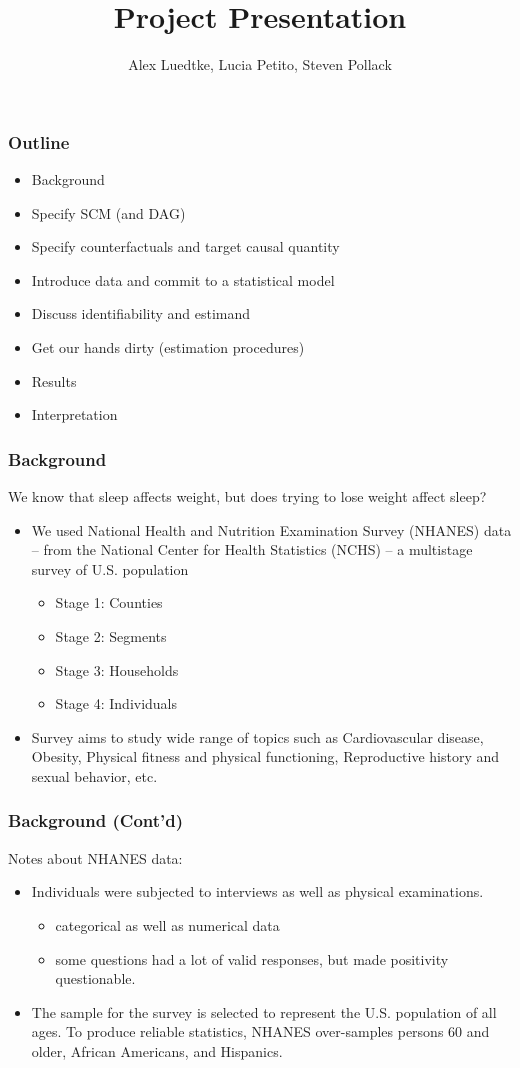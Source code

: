 \documentclass{beamer}
\title[ On the affect of ``attempting to lose weight'' on sleep ]{Project Presentation}
\author{Alex Luedtke, Lucia Petito, Steven Pollack}
\institute{PHC252D}
\date{}
\begin{document}
\maketitle 
\begin{frame}
 \frametitle{Outline} %
  \begin{itemize}
    \item Background
    \item Specify SCM (and DAG)
    \item Specify counterfactuals and target causal quantity
    \item Introduce data and commit to a statistical model
    \item Discuss identifiability and estimand
    \item Get our hands dirty (estimation procedures)
    \item Results
    \item Interpretation
  \end{itemize}
\end{frame}

\begin{frame}
 \frametitle{Background}
 We know that sleep affects weight, but does trying to lose weight affect sleep?
 \begin{itemize}
  \item We used National Health and Nutrition Examination Survey (NHANES) data -- from the National Center for Health Statistics (NCHS) -- a multistage survey of U.S. population
    \begin{itemize}
      \item Stage 1: Counties
      \item Stage 2: Segments
      \item Stage 3: Households
      \item Stage 4: Individuals
    \end{itemize}
  \item Survey aims to study wide range of topics such as Cardiovascular disease, Obesity, Physical fitness and physical functioning, Reproductive history and sexual behavior, etc.
  \end{itemize}
\end{frame}

\begin{frame}
  \frametitle{Background (Cont'd)}
  Notes about NHANES data:
  \begin{itemize}
 \item Individuals were subjected to interviews as well as physical examinations.
  \begin{itemize}
    \item categorical as well as numerical data
    \item some questions had a lot of valid responses, but made positivity questionable.
  \end{itemize}
 \item The sample for the survey is selected to represent the U.S. population of all ages. To produce reliable statistics, NHANES over-samples persons 60 and older, African Americans, and Hispanics.
 \end{itemize}
\end{frame}
\end{document}
